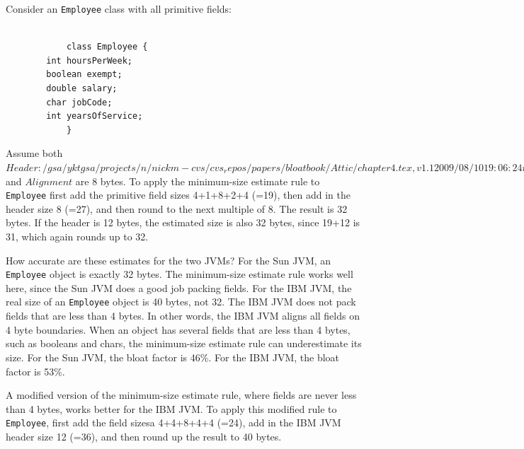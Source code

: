 \begin{example}
Consider an \texttt{Employee} class with all primitive fields:

\ttfamily
\begin{verbatim} 

			class Employee {
        int hoursPerWeek;
        boolean exempt;
        double salary;
        char jobCode;
        int yearsOfService;
			}
\end{verbatim}
\normalfont
Assume both $Header: /gsa/yktgsa/projects/n/nickm-cvs/cvs_repos/papers/bloatbook/Attic/chapter4.tex,v 1.1 2009/08/10 19:06:24 nickm Exp $ and $Alignment$ are 8 bytes. To apply the minimum-size estimate rule to \texttt{Employee} first add the primitive field sizes 4+1+8+2+4 (=19), then add in the header size 8 (=27), and then round to the next multiple of 8. The result is 32 bytes.  If the header is 12 bytes, the estimated size is also 32 bytes, since 19+12 is 31, which again rounds up to 32. 
\end{example}

How accurate are these estimates for the two JVMs?  For the Sun JVM, an \texttt{Employee} object is exactly 32 bytes. The minimum-size estimate rule works well here, since the Sun JVM does a good job packing fields. For the IBM JVM, the real size of an \texttt{Employee} object is 40 bytes, not 32. The IBM JVM does not pack fields that are less than 4 bytes. In other words, the IBM JVM aligns all fields on 4 byte boundaries. When an object has several fields that are less than 4 bytes, such as booleans and chars, the minimum-size estimate rule can underestimate its size. For the Sun JVM, the bloat factor is 46\%. For the IBM JVM, the bloat factor is 53\%. 

A modified version of the minimum-size estimate rule, where fields are never less than 4 bytes, works better for the IBM JVM. To apply this modified rule to \texttt{Employee}, first add the field sizesa 4+4+8+4+4 (=24), add in the IBM JVM header size 12 (=36), and then round up the result to 40 bytes.


